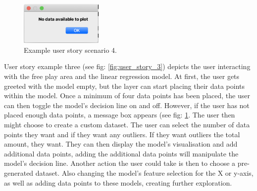 	\begin{figure}[t]
		\begin{center}
			\includegraphics[width=4cm]{graphics/not_enough_data.png}
			\caption{Example user story scenario 4.}
			\label{fig:not_enough_data}
		\end{center}
	\end{figure}
	
	
	User story example three (see fig: \ref{fig:user_story_3}) depicts the user interacting with the free play area and the linear regression model. At first, the user gets greeted with the model empty, but the layer can start placing their data points within the model. Once a minimum of four data points has been placed, the user can then toggle the model's decision line on and off. However, if the user has not placed enough data points, a message box appears (see fig: \ref{fig:not_enough_data}. The user then might choose to create a custom dataset. The user can select the number of data points they want and if they want any outliers. If they want outliers the total amount, they want. They can then display the model's visualisation and add additional data points, adding the additional data points will manipulate the model's decision line. Another action the user could take is then to choose a pre-generated dataset. Also changing the model's feature selection for the X or y-axis, as well as adding data points to these models, creating further exploration.
	
		
	
	
	
